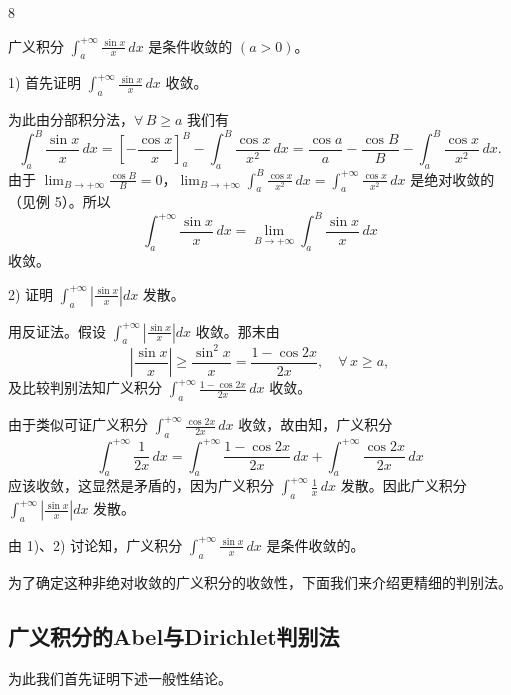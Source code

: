 \begin{sourceexample}{8}

广义积分 $\displaystyle\int_a^{+\infty}\frac{\sin x}{x}\,dx$ 是条件收敛的 $(a>0)$。

1) 首先证明 $\displaystyle\int_a^{+\infty}\frac{\sin x}{x}\,dx$ 收敛。

为此由分部积分法，$\forall\,B\geqslant a$ 我们有
\[\int_a^B\frac{\sin x}{x}\,dx=\left[-\frac{\cos x}{x}\right]_a^B-\int_a^B\frac{\cos x}{x^2}\,dx=\frac{\cos a}{a}-\frac{\cos B}{B}-\int_a^B\frac{\cos x}{x^2}\,dx.\]
由于 $\displaystyle\lim_{B\to+\infty}\frac{\cos B}{B}=0$，$\displaystyle\lim_{B\to+\infty}\int_a^B\frac{\cos x}{x^2}\,dx=\int_a^{+\infty}\frac{\cos x}{x^2}\,dx$ 是绝对收敛的（见例 5）。所以
\[\int_a^{+\infty}\frac{\sin x}{x}\,dx=\lim_{B\to+\infty}\int_a^B\frac{\sin x}{x}\,dx\]
收敛。

2) 证明 $\displaystyle\int_a^{+\infty}\left|\frac{\sin x}{x}\right|dx$ 发散。

用反证法。假设 $\displaystyle\int_a^{+\infty}\left|\frac{\sin x}{x}\right|dx$ 收敛。那末由
\[\left|\frac{\sin x}{x}\right|\geqslant\frac{\sin^2x}{x}=\frac{1-\cos2x}{2x},\quad\forall\,x\geqslant a,\]
及比较判别法知广义积分 $\displaystyle\int_a^{+\infty}\frac{1-\cos2x}{2x}\,dx$ 收敛。

由于类似可证广义积分 $\displaystyle\int_a^{+\infty}\frac{\cos2x}{2x}\,dx$ 收敛，故由知，广义积分
\[\int_a^{+\infty}\frac{1}{2x}\,dx=\int_a^{+\infty}\frac{1-\cos2x}{2x}\,dx+\int_a^{+\infty}\frac{\cos2x}{2x}\,dx\]
应该收敛，这显然是矛盾的，因为广义积分 $\displaystyle\int_a^{+\infty}\frac{1}{x}\,dx$ 发散。因此广义积分 $\displaystyle\int_a^{+\infty}\left|\frac{\sin x}{x}\right|dx$ 发散。

由 1)、2) 讨论知，广义积分 $\displaystyle\int_a^{+\infty}\frac{\sin x}{x}\,dx$ 是条件收敛的。

\end{sourceexample}

为了确定这种非绝对收敛的广义积分的收敛性，下面我们来介绍更精细的判别法。

\subsection{广义积分的Abel与Dirichlet判别法}
	\label{sec:9-2-3}

为此我们首先证明下述一般性结论。

